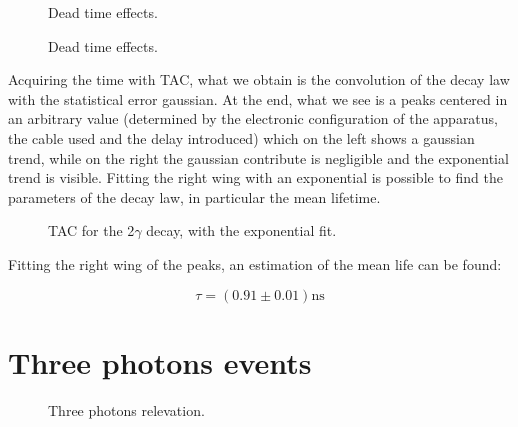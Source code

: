 \documentclass[11pt,a4 paper]{article}
\begin{document}
\begin{figure}[H]
    \centering
     \quad
    \caption{Dead time effects.} \quad
    \caption{Dead time effects.}
    \label{fig:2gamma}
\end{figure}

Acquiring the time with TAC, what we obtain is the convolution of the decay law with the statistical error gaussian. At the end, what we see is a peaks centered in an arbitrary value (determined by the electronic configuration of the apparatus, the cable used and the delay introduced) which on the left shows a gaussian trend, while on the right the gaussian contribute is negligible and the exponential trend is visible. Fitting the right wing with an exponential is possible to find the parameters of the decay law, in particular the mean lifetime.

\begin{figure}[H]
    \centering
    \caption{TAC for the 2$\gamma$ decay, with the exponential fit.}
    \label{fig:tac:2gamma}
\end{figure}

Fitting the right wing of the peaks, an estimation of the mean life can be found:

\begin{equation}
    \tau = ( 0.91 \pm 0.01) \si{\nano\second}
\end{equation}

\section{Three photons events}

\begin{figure}[H]
    \centering
     \quad
    \caption{Three photons relevation.}
    \label{fig:rivel120}
\end{figure}
\end{document}

